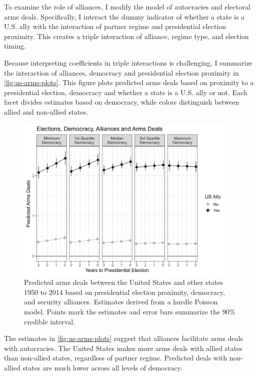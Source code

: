 \documentclass[12pt]{article}
\begin{document}
To examine the role of alliances, I modify the model of autocracies and electoral arms deals.
Specifically, I interact the dummy indicator of whether a state is a U.S. ally with the interaction of partner regime and presidential election proximity. 
This creates a triple interaction of alliance, regime type, and election timing. 


Because interpreting coefficients in triple interactions is challenging, I summarize the interaction of alliances, democracy and presidential election proximity in \autoref{fig:us-arms-plots}.
This figure plots predicted arms deals based on proximity to a presidential election, democracy and whether a state is a U.S. ally or not. 
Each facet divides estimates based on democracy, while colors distinguish between allied and non-allied states. 


\begin{figure}[htpb]
	\centering
		\includegraphics[width=0.95\textwidth]{../figures/us-arms-plots.png}
	\caption{Predicted arms deals between the United States and other states 1950 to 2014 based on presidential election proximity, democracy, and security alliances. Estimates derived from a hurdle Poisson model. Points mark the estimates and error bars summarize the 90\% credible interval.}
	\label{fig:us-arms-plots}
\end{figure}


The estimates in \autoref{fig:us-arms-plots} suggest that alliances facilitate arms deals with autocracies.
The United States makes more arms deals with allied states than non-allied states, regardless of partner regime. 
Predicted deals with non-allied states are much lower across all levels of democracy. 
\end{document}
